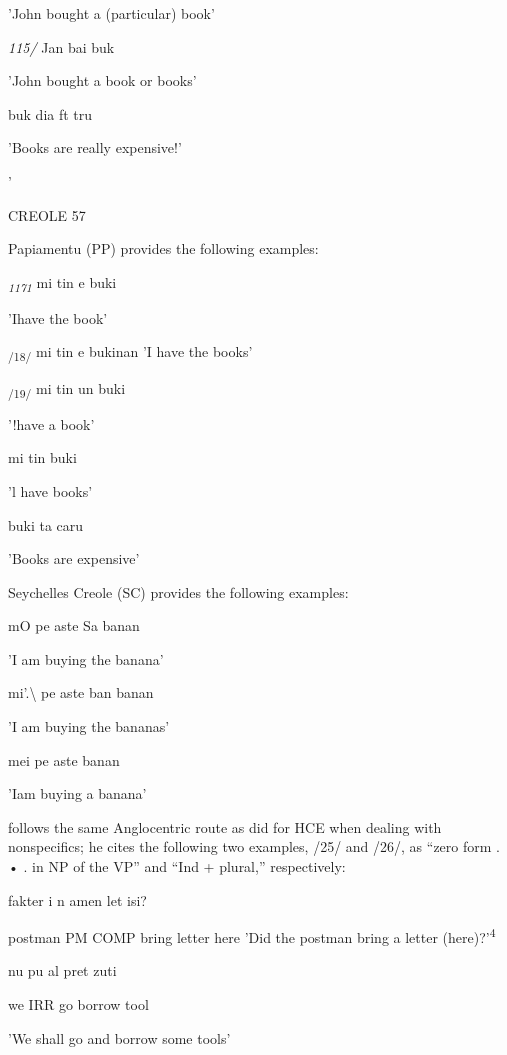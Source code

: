 'John bought a (particular) book'

\textit{115/ }Jan bai buk

'John bought a book or books'

\ea\label{ex:16}
 buk dia ft tru
\glt
\z

'Books are really expensive!'

'

CREOLE 57

Papiamentu (PP) provides the following examples:

\textit{\textsubscript{1171}}\textsubscript{ }mi tin e buki

'Ihave the book'

\textsubscript{/18}\textsubscript{/}\textsubscript{ }mi tin e bukinan 'I have the books'

\textsubscript{/1}\textsubscript{9/}\textsubscript{ }mi tin un buki

'!have a book'

\ea\label{ex:20}
mi tin buki
\glt
\z

'l have books'

\ea\label{ex:21}
buki ta caru
\glt
\z

'Books are expensive'

Seychelles Creole (SC) provides the following examples:

\ea\label{ex:22}
 mO pe aste Sa banan
\glt
\z

'I am buying the banana'

\ea\label{ex:23}
 mi'.{\textbackslash} pe aste ban banan
\glt
\z

'I am buying the bananas'

\ea\label{ex:24}
 mei pe aste banan
\glt
\z

'Iam buying a banana'

\citet[13]{Corne1977} follows the same Anglocentric route as \citet{Perlman1973} did for HCE when dealing with nonspecifics; he cites the follow\-ing two examples, /25/ and /26/, as ``zero form . • . in NP of the VP'' and ``Ind + plural,'' respectively:

\ea\label{ex:25}
 fakter i n amen let isi?
\glt
\z

postman PM COMP bring letter here 'Did the postman bring a letter (here)?'\textsuperscript{4}

\ea\label{ex:26}
 nu pu al pret zuti
\glt
\z

we IRR go borrow tool

'We shall go and borrow some tools'


